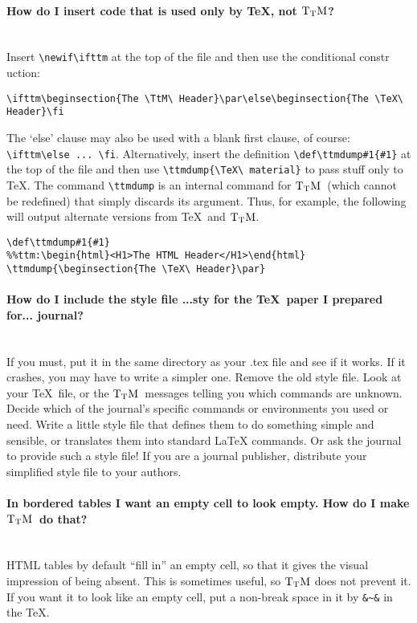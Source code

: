 \documentclass[12pt]{article}
\def\ttmdump{}
\newif\ifttm
\def\TtM{$\rm{}T_TH$}
\def\TtM{$\rm{}T_TM$}%
\begin{document}
\paragraph{How do I insert code that is used only by \TeX, not \TtM?}\leavevmode\\
Insert \verb|\newif\ifttm| at the top of the file and then use
the conditional constr
uction:
\begin{verbatim}\ifttm\beginsection{The \TtM\ Header}\par\else\beginsection{The \TeX\ Header}\fi
\end{verbatim}
The `else' clause may also be used with a blank first clause, of
course: \verb|\ifttm\else ... \fi|.
Alternatively, insert the definition \verb+\def\ttmdump#1{#1}+ at the
top of the file and then use \verb+\ttmdump{\TeX\ material}+ to pass
stuff only to \TeX. The command \verb+\ttmdump+ is an internal command
for \TtM\ (which cannot be redefined) that simply discards its argument.
Thus, for example, the following will output
alternate versions from \TeX\ and \TtM.\begin{verbatim}
\def\ttmdump#1{#1}
%%ttm:\begin{html}<H1>The HTML Header</H1>\end{html}
\ttmdump{\beginsection{The \TeX\ Header}\par}
\end{verbatim}

\paragraph{How do I include the style file ...sty for the \TeX\ paper I prepared for... journal?}\leavevmode\\ 
 If you must, put it in the same directory as your .tex file and see
 if it works. If it crashes, you may have to write a simpler one.
 Remove the old style file. Look at your \TeX\ file, or the
 \TtM\ messages telling you which commands are unknown. Decide which of
 the journal's specific commands or environments you used or
 need. Write a little style file that defines them to do something
 simple and sensible, or translates them into standard \LaTeX
 commands. Or ask the journal to provide such a style file! If you are
 a journal publisher, distribute your simplified style file to your
 authors.

\paragraph{In bordered tables I want an empty cell to look
empty. How do I make \TtM\ do that?}\leavevmode\\
HTML tables by default ``fill in'' an empty cell, so that it gives the
visual impression of being absent. This is sometimes useful, so \TtM
does not prevent it. If you want it to look like an empty cell, put a
non-break space in it by \verb+&~&+ in the \TeX.
\end{document}
